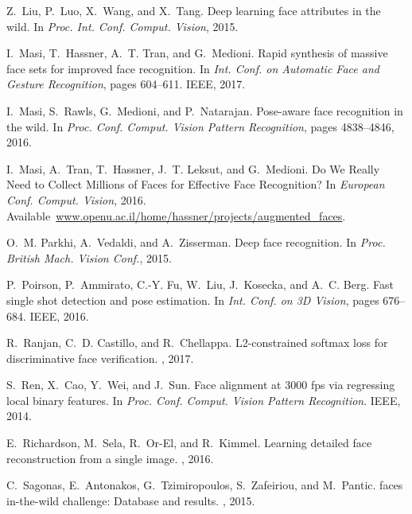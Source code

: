 \documentclass[10pt,twocolumn,letterpaper]{article}
\begin{document}
{\begin{thebibliography}{10}
Z.~Liu, P.~Luo, X.~Wang, and X.~Tang.
\newblock Deep learning face attributes in the wild.
\newblock In {\em Proc. Int. Conf. Comput. Vision}, 2015.

I.~Masi, T.~Hassner, A.~T. Tran, and G.~Medioni.
\newblock Rapid synthesis of massive face sets for improved face recognition.
\newblock In {\em Int. Conf. on Automatic Face and Gesture Recognition}, pages
  604--611. IEEE, 2017.

I.~Masi, S.~Rawls, G.~Medioni, and P.~Natarajan.
\newblock Pose-aware face recognition in the wild.
\newblock In {\em Proc. Conf. Comput. Vision Pattern Recognition}, pages
  4838--4846, 2016.

I.~Masi, A.~Tran, T.~Hassner, J.~T. Leksut, and G.~Medioni.
\newblock Do {W}e {R}eally {N}eed to {C}ollect {M}illions of {F}aces for
  {E}ffective {F}ace {R}ecognition?
\newblock In {\em European Conf. Comput. Vision}, 2016.
\newblock
  Available~\url{www.openu.ac.il/home/hassner/projects/augmented_faces}.

O.~M. Parkhi, A.~Vedaldi, and A.~Zisserman.
\newblock Deep face recognition.
\newblock In {\em Proc. British Mach. Vision Conf.}, 2015.

P.~Poirson, P.~Ammirato, C.-Y. Fu, W.~Liu, J.~Kosecka, and A.~C. Berg.
\newblock Fast single shot detection and pose estimation.
\newblock In {\em Int. Conf. on 3D Vision}, pages 676--684. IEEE, 2016.

R.~Ranjan, C.~D. Castillo, and R.~Chellappa.
\newblock L2-constrained softmax loss for discriminative face verification.
, 2017.

S.~Ren, X.~Cao, Y.~Wei, and J.~Sun.
\newblock Face alignment at 3000 fps via regressing local binary features.
\newblock In {\em Proc. Conf. Comput. Vision Pattern Recognition}. IEEE, 2014.

E.~Richardson, M.~Sela, R.~Or-El, and R.~Kimmel.
\newblock Learning detailed face reconstruction from a single image.
, 2016.

C.~Sagonas, E.~Antonakos, G.~Tzimiropoulos, S.~Zafeiriou, and M.~Pantic.
 faces in-the-wild challenge: Database and results.
, 2015.


\end{thebibliography}}
\end{document}
